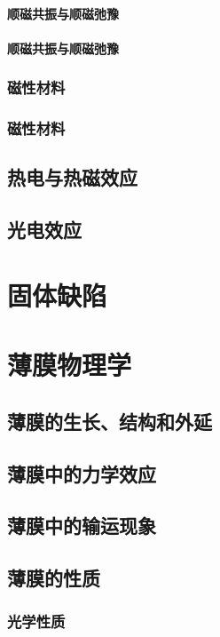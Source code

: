 \documentclass[UTF8]{../06-Physics}
\begin{document}
        \subsubsection{顺磁共振与顺磁弛豫}
        \subsubsection{顺磁共振与顺磁弛豫}
    \subsection{磁性材料}
    \subsection{磁性材料}

\section{热电与热磁效应}
\section{光电效应}




\chapter{固体缺陷}




\chapter{薄膜物理学}
\section{薄膜的生长、结构和外延}
\section{薄膜中的力学效应}
\section{薄膜中的输运现象}
\section{薄膜的性质}
    \subsection{光学性质}
\end{document}
